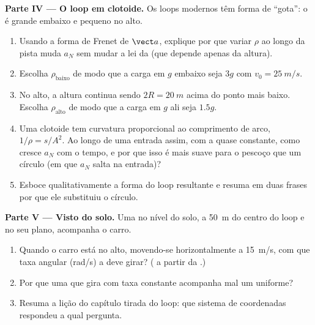 \begin{problem}
\medskip
\noindent\textbf{Parte IV --- O loop em clotoide.}
Os loops modernos têm forma de ``gota'': o  é grande
embaixo e pequeno no alto.
\begin{enumerate}[resume]
  \item Usando a forma de Frenet de $\vect a$, explique por que variar $\rho$
        ao longo da pista muda $a_N$ sem mudar a lei da 
        (que depende apenas da altura).
  \item Escolha $\rho_{\text{baixo}}$ de modo que a carga em $g$ embaixo
        seja $3g$ com $v_0 = \qty{25}{m/s}$.
  \item No alto, a altura continua sendo $2R = \qty{20}{m}$ acima do
        ponto mais baixo. Escolha $\rho_{\text{alto}}$ de modo que a carga em $g$ ali seja
        $1.5g$.
  \item Uma clotoide tem curvatura proporcional ao comprimento de arco,
        $1/\rho = s/A^2$. Ao longo de uma entrada assim, com a  quase
        constante, como cresce $a_N$ com o tempo, e por que isso é mais suave
        para o pescoço que um círculo (em que $a_N$ salta na entrada)?
  \item Esboce qualitativamente a forma do loop resultante e resuma em
        duas frases por que ele substituiu o círculo.
\end{enumerate}

\medskip
\noindent\textbf{Parte V --- Visto do solo.}
Uma  no nível do solo, a \qty{50}{m} do centro do loop e no seu
plano, acompanha o carro.
\begin{enumerate}[resume]
  \item Quando o carro está no alto, movendo-se horizontalmente a
        \qty{15}{m/s}, com que taxa angular (rad/s) a  deve girar?
        ( a partir da .)
  \item Por que uma  que gira com taxa constante acompanha mal um
         uniforme?
  \item Resuma a lição do capítulo tirada do loop: que sistema de
        coordenadas respondeu a qual pergunta.
\end{enumerate}
\end{problem}
